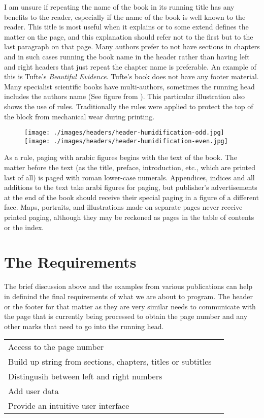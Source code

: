 I am unsure if repeating the name of the book in its running title has any benefits to the reader, especially if the name of the book is well known to the reader. This title is most useful when it explains or to some extend defines the matter on the page, and this explanation should refer not to the first but to the last paragraph on that page.  Many authors prefer to not have sections in chapters and in such cases running the book name in the header rather than having left and right headers that just repeat the chapter name is preferable. An example of this is Tufte’s \textit{Beautiful Evidence}.  Tufte’s book does not have any footer material.  Many specialist scientific books have multi-authors, sometimes the running head includes the authors name (See figure from ). This particular illustration also shows the use of rules. Traditionally the rules were applied to protect the top of the block from mechanical wear during printing. 

\begin{figure}[hb]
\texttt{[image: ./images/headers/header-humidification-odd.jpg]}
\texttt{[image: ./images/headers/header-humidification-even.jpg]}
\end{figure}

As a rule,  paging with arabic figures begins with the text of the book. The matter before the text (as the title, preface, introduction, etc., which are printed last of all) is paged with roman lower-case numerals. Appendices, indices and all additions to the text take arabi figures for paging, but publisher’s advertisements at the end of the book should receive their special paging in a figure of a different face. Maps, portraits, and illustrations made on separate pages never receive printed paging, although they may be reckoned as pages in the table of contents or the index. 

\section{The Requirements}

The brief discussion above and the examples from various publications can help in definind the final requirements of what we are about to program. The header or the footer for that matter as they are very similar needs to communicate with the page that is currently being processed to obtain the page number and any other marks that need to go into the running head.

\begin{tabular}{>{\raggedright}p{5cm}l}
Access to the page number & \\
Build up string from sections, chapters, titles or subtitles &\\
Distingusih between left and right numbers &\\
Add user data  &\\
Provide an intuitive user interface&\\
\end{tabular}

